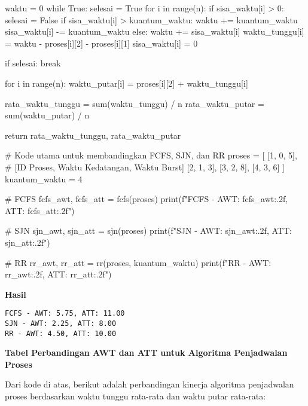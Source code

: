 \documentclass[12pt]{article}
\begin{document}
\begin{python}
    waktu = 0
    while True:
        selesai = True
        for i in range(n):
            if sisa_waktu[i] > 0:
                selesai = False
                if sisa_waktu[i] > kuantum_waktu:
                    waktu += kuantum_waktu
                    sisa_waktu[i] -= kuantum_waktu
                else:
                    waktu += sisa_waktu[i]
                    waktu_tunggu[i] = waktu - proses[i][2] - proses[i][1]
                    sisa_waktu[i] = 0

        if selesai:
            break

    for i in range(n):
        waktu_putar[i] = proses[i][2] + waktu_tunggu[i]

    rata_waktu_tunggu = sum(waktu_tunggu) / n
    rata_waktu_putar = sum(waktu_putar) / n

    return rata_waktu_tunggu, rata_waktu_putar

# Kode utama untuk membandingkan FCFS, SJN, dan RR
proses = [
    [1, 0, 5],  # [ID Proses, Waktu Kedatangan, Waktu Burst]
    [2, 1, 3],
    [3, 2, 8],
    [4, 3, 6]
]
kuantum_waktu = 4

# FCFS
fcfs_awt, fcfs_att = fcfs(proses)
print(f"FCFS - AWT: {fcfs_awt:.2f}, ATT: {fcfs_att:.2f}")

# SJN
sjn_awt, sjn_att = sjn(proses)
print(f"SJN - AWT: {sjn_awt:.2f}, ATT: {sjn_att:.2f}")

# RR
rr_awt, rr_att = rr(proses, kuantum_waktu)
print(f"RR - AWT: {rr_awt:.2f}, ATT: {rr_att:.2f}")
\end{python}

\textbf{Hasil}

\vspace{0.5cm}
\begin{verbatim}
FCFS - AWT: 5.75, ATT: 11.00
SJN - AWT: 2.25, ATT: 8.00
RR - AWT: 4.50, ATT: 10.00
\end{verbatim}

\textbf{Tabel Perbandingan AWT dan ATT untuk Algoritma Penjadwalan Proses}

Dari kode di atas, berikut adalah perbandingan kinerja algoritma penjadwalan proses berdasarkan waktu tunggu rata-rata dan waktu putar rata-rata:
\end{document}
